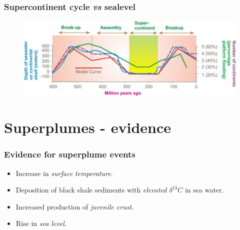 \documentclass{beamer}
\begin{document}
        \begin{frame}
        \frametitle{Supercontinent cycle \textit{vs} sealevel}
        \begin{figure}
        \begin{center}
                \includegraphics[width=\textwidth]{sealevel.png}
        \end{center}
        \end{figure}
        \end{frame}

        \section{Superplumes - evidence}

        \begin{frame}
        \frametitle{Evidence for superplume events}
        \begin{itemize}
                \item Increase in \emph{surface temperature}.
                \item Deposition of black shale sediments with \emph{elevated $\delta^{13}C$} in sea water.
                \item Increased production of \emph{juvenile crust}.
                \item Rise in \emph{sea level}.
        \end{itemize}
        \end{frame}
\end{document}
